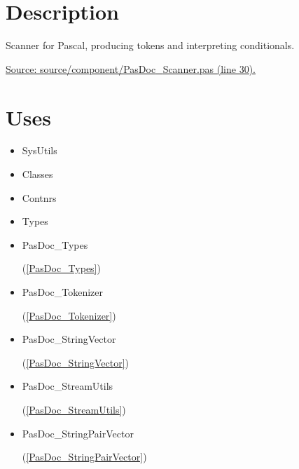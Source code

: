 \documentclass{report}
\begin{document}
\section{Description}
Scanner for Pascal, producing tokens and interpreting conditionals.\hfill\vspace*{1ex}



    \par
\href{https://github.com/pasdoc/pasdoc/blob/master/source/component/PasDoc_Scanner.pas#L30}{Source: source/component/PasDoc{\_}Scanner.pas (line 30).}
\section{Uses}
\begin{itemize}
\item \begin{ttfamily}SysUtils\end{ttfamily}\item \begin{ttfamily}Classes\end{ttfamily}\item \begin{ttfamily}Contnrs\end{ttfamily}\item \begin{ttfamily}Types\end{ttfamily}\item \begin{ttfamily}PasDoc{\_}Types\end{ttfamily}(\ref{PasDoc_Types})\item \begin{ttfamily}PasDoc{\_}Tokenizer\end{ttfamily}(\ref{PasDoc_Tokenizer})\item \begin{ttfamily}PasDoc{\_}StringVector\end{ttfamily}(\ref{PasDoc_StringVector})\item \begin{ttfamily}PasDoc{\_}StreamUtils\end{ttfamily}(\ref{PasDoc_StreamUtils})\item \begin{ttfamily}PasDoc{\_}StringPairVector\end{ttfamily}(\ref{PasDoc_StringPairVector})\end{itemize}
\end{document}
